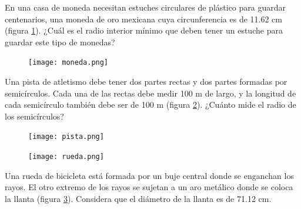 \documentclass[11pt]{book}
\begin{document}
\begin{enumerate}
        \begin{minipage}[t]{0.7\textwidth}
          \item En una casa de moneda necesitan estuches circulares de
          plástico para guardar centenarios, una moneda de oro mexicana cuya circunferencia es de 11.62 cm (figura \ref{fig:moneda}). ¿Cuál
          es el radio interior mínimo que deben tener un estuche para guardar este tipo de monedas?
        \end{minipage}\hfill
        \begin{minipage}[t]{0.2\textwidth}
          \begin{figure}[H]
            \centering
            \texttt{[image: moneda.png]}
            \label{fig:moneda}
          \end{figure}
        \end{minipage}



        \begin{minipage}[t]{0.7\textwidth}
          \item Una pista de atletismo debe tener dos partes rectas y dos partes formadas por
          semicírculos. Cada una de las rectas debe medir 100 m de largo, y la longitud de
          cada semicírculo también debe ser de 100 m (figura \ref{fig:pista}). ¿Cuánto mide el radio de los semicírculos?
        \end{minipage}\hfill
        \begin{minipage}[t]{0.2\textwidth}
          \begin{figure}[H]
            \centering
            \texttt{[image: pista.png]}
            \label{fig:pista}
          \end{figure}
        \end{minipage}

        \begin{minipage}[t]{0.2\textwidth}
          \begin{figure}[H]
            \centering
            \texttt{[image: rueda.png]}
            \label{fig:rueda}
          \end{figure}
        \end{minipage}\hfill
        \begin{minipage}[t]{0.7\textwidth}
          \item Una rueda de bicicleta está formada por un buje central donde se enganchan los
          rayos. El otro extremo de los rayos se sujetan a un aro metálico donde se coloca
          la llanta (figura \ref{fig:rueda}). Considera que el diámetro de la llanta es de 71.12 cm.


\end{minipage}
\end{enumerate}
\end{document}
